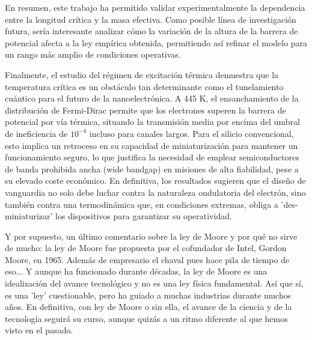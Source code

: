 En resumen, este trabajo ha permitido validar experimentalmente la dependencia entre la longitud crítica y la masa efectiva. Como posible línea de investigación futura, sería interesante analizar cómo la variación de la altura de la barrera de potencial afecta a la ley empírica obtenida, permitiendo así refinar el modelo para un rango más amplio de condiciones operativas.

Finalmente, el estudio del régimen de excitación térmica demuestra que la temperatura crítica es un obstáculo tan determinante como el tunelamiento cuántico para el futuro de la nanoelectrónica. A 445 K, el ensanchamiento de la distribución de Fermi-Dirac permite que los electrones superen la barrera de potencial por vía térmica, situando la transmisión media por encima del umbral de ineficiencia de $10^{-4}$ incluso para canales largos. Para el silicio convencional, esto implica un retroceso en su capacidad de miniaturización para mantener un funcionamiento seguro, lo que justifica la necesidad de emplear semiconductores de banda prohibida ancha (wide bandgap) en misiones de alta fiabilidad, pese a su elevado coste económico. En definitiva, los resultados sugieren que el diseño de vanguardia no solo debe luchar contra la naturaleza ondulatoria del electrón, sino también contra una termodinámica que, en condiciones extremas, obliga a 'des-miniaturizar' los dispositivos para garantizar su operatividad.

Y por supuesto, un último comentario sobre la ley de Moore y por qué no sirve de mucho: la ley de Moore fue propuesta por el cofundador de Intel, Gordon Moore, en 1965. Además de empresario el chaval pues hace pila de tiempo de eso... Y aunque ha funcionado durante décadas, la ley de Moore es una idealización del avance tecnológico y no es una ley física fundamental. Así que sí, es una 'ley' cuestionable, pero ha guiado a muchas industrias durante muchos años. En definitiva, con ley de Moore o sin ella, el avance de la ciencia y de la tecnología seguirá su curso, aunque quizás a un ritmo diferente al que hemos visto en el pasado.
